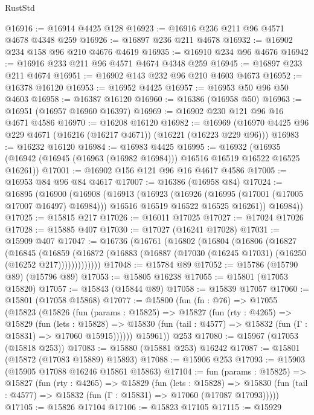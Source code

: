 \begin{lexlean}{RustStd}
\begin{coremodule}
@16916 := @16914 @4425 @128
@16923 := @16916 @236 @211 @96 @4571 @4678 @4348 @259
@16926 := @16897 @236 @211 @4678
@16932 := @16902 @234 @158 @96 @210 @4676 @4619
@16935 := @16910 @234 @96 @4676
@16942 := @16916 @233 @211 @96 @4571 @4674 @4348 @259
@16945 := @16897 @233 @211 @4674
@16951 := @16902 @143 @232 @96 @210 @4603 @4673
@16952 := @16378 @16120
@16953 := @16952 @4425
@16957 := @16953 @50 @96 @50 @4603
@16958 := @16387 @16120
@16960 := @16386 (@16958 @50)
@16963 := @16951 (@16957 @16960 @16397)
@16969 := @16902 @230 @121 @96 @16 @4671 @4586
@16970 := @16208 @16120
@16982 := @16969 (@16970 @4425 @96 @229 @4671 (@16216 (@16217 @4671)) (@16221 (@16223 @229 @96)))
@16983 := @16232 @16120
@16984 := @16983 @4425
@16995 := @16932
    (@16935 (@16942 (@16945 (@16963 (@16982 @16984))) @16516 @16519 @16522 @16525 @16261))
@17001 := @16902 @156 @121 @96 @16 @4617 @4586
@17005 := @16953 @84 @96 @84 @4617
@17007 := @16386 (@16958 @84)
@17024 := @16895
    (@16900
      (@16908
        (@16913
          (@16923
            (@16926 (@16995 (@17001 (@17005 @17007 @16497) @16984)))
            @16516
            @16519
            @16522
            @16525
            @16261))
        @16984))
@17025 := @15815 @217
@17026 := @16011 @17025
@17027 := @17024 @17026
@17028 := @15885 @407
@17030 := @17027 (@16241 @17028)
@17031 := @15909 @407
@17047 := @16736
    (@16761
      (@16802
        (@16804
          (@16806
            (@16827
              (@16845
                (@16859
                  (@16872 (@16883 (@16887 (@17030 (@16245 @17031) (@16250 (@16252 @217)))))))))))))
@17048 := @15784 @89
@17052 := @15786 (@15790 @89) (@15796 @89)
@17053 := @15805 @16238
@17055 := @15801 (@17053 @15820)
@17057 := @15843 (@15844 @89)
@17058 := @15839 @17057
@17060 := @15801 (@17058 @15868)
@17077 := @15800
    (fun (fn : @76) =>
    @17055
      (@15823
        (@15826
          (fun (params : @15825) =>
          @15827
            (fun (rty : @4265) =>
            @15829
              (fun (lets : @15828) =>
              @15830 (fun (tail : @4577) => @15832 (fun (Γ : @15831) => @17060 @15915))))))
        @15961))
    @253
@17080 := @15967 (@17053 (@15818 @253))
@17083 := @15880 (@15881 @253) @16242
@17087 := @15801 (@15872 (@17083 @15889) @15893)
@17088 := @15906 @253
@17093 := @15903 (@15905 @17088 @16246 @15861 @15863)
@17104 := fun (params : @15825) =>
  @15827
    (fun (rty : @4265) =>
    @15829
      (fun (lets : @15828) =>
      @15830 (fun (tail : @4577) => @15832 (fun (Γ : @15831) => @17060 (@17087 @17093)))))
@17105 := @15826 @17104
@17106 := @15823 @17105
@17115 := @15929

\end{coremodule}
\end{lexlean}

